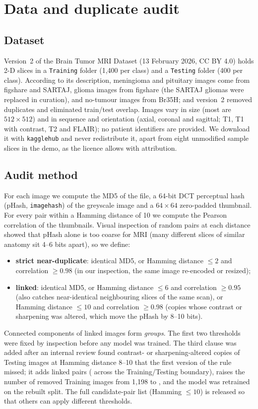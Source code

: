 \documentclass[11pt,a4paper]{article}
\begin{document}
\section{Data and duplicate audit}
\subsection{Dataset}
Version~2 of the Brain Tumor MRI Dataset (13 February 2026, CC BY 4.0) holds \DNImages{} 2-D slices in a \texttt{Training} folder (1{,}400 per class) and a \texttt{Testing} folder (400 per class). According to its description, meningioma and pituitary images come from figshare \citep{cheng2015} and SARTAJ, glioma images from figshare (the SARTAJ gliomas were replaced in curation), and no-tumour images from Br35H; and version~2 removed duplicates and eliminated train/test overlap. Images vary in size (most are $512\times512$) and in sequence and orientation (axial, coronal and sagittal; T1, T1 with contrast, T2 and FLAIR); no patient identifiers are provided. We download it with \texttt{kagglehub} and never redistribute it, apart from eight unmodified sample slices in the demo, as the licence allows with attribution.

\subsection{Audit method}
For each image we compute the MD5 of the file, a 64-bit DCT perceptual hash (pHash, \texttt{imagehash}) of the greyscale image and a $64\times64$ zero-padded thumbnail. For every pair within a Hamming distance of 10 we compute the Pearson correlation of the thumbnails. Visual inspection of random pairs at each distance showed that pHash alone is too coarse for MRI (many different slices of similar anatomy sit 4--6 bits apart), so we define:
\begin{itemize}
\item \textbf{strict near-duplicate}: identical MD5, or Hamming distance $\le 2$ and correlation $\ge 0.98$ (in our inspection, the same image re-encoded or resized);
\item \textbf{linked}: identical MD5, or Hamming distance $\le 6$ and correlation $\ge 0.95$ (also catches near-identical neighbouring slices of the same scan), or Hamming distance $\le 10$ and correlation $\ge 0.98$ (copies whose contrast or sharpening was altered, which move the pHash by 8--10 bits).
\end{itemize}
Connected components of linked images form \emph{groups}. The first two thresholds were fixed by inspection before any model was trained. The third clause was added after an internal review found contrast- or sharpening-altered copies of Testing images at Hamming distance 8--10 that the first version of the rule missed; it adds \DExtraPairsVTwoRule{} linked pairs (\DExtraCrossSplitPairsVTwoRule{} across the Training/Testing boundary), raises the number of removed Training images from 1{,}198 to \DTrainImgRemovedCrossSplit{}, and the model was retrained on the rebuilt split. The full candidate-pair list (Hamming $\le 10$) is released so that others can apply different thresholds.
\end{document}
